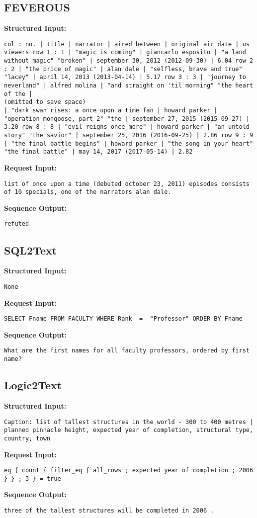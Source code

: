 \documentclass[11pt]{article}
\begin{document}
\subsection{FEVEROUS}
\textbf{Structured Input:} 
\begin{lstlisting}
col : no. | title | narrator | aired between | original air date | us viewers row 1 : 1 | "magic is coming" | giancarlo esposito | "a land without magic" "broken" | september 30, 2012 (2012-09-30) | 6.04 row 2 : 2 | "the price of magic" | alan dale | "selfless, brave and true" "lacey" | april 14, 2013 (2013-04-14) | 5.17 row 3 : 3 | "journey to neverland" | alfred molina | "and straight on 'til morning" "the heart of the | 
(omitted to save space)
| "dark swan rises: a once upon a time fan | howard parker | "operation mongoose, part 2" "the | september 27, 2015 (2015-09-27) | 3.20 row 8 : 8 | "evil reigns once more" | howard parker | "an untold story" "the savior" | september 25, 2016 (2016-09-25) | 2.86 row 9 : 9 | "the final battle begins" | howard parker | "the song in your heart" "the final battle" | may 14, 2017 (2017-05-14) | 2.82
\end{lstlisting}
\textbf{Request Input:} 
\begin{lstlisting}
list of once upon a time (debuted october 23, 2011) episodes consists of 10 specials, one of the narrators alan dale.
\end{lstlisting}
\textbf{Sequence Output:} 
\begin{lstlisting}
refuted
\end{lstlisting}

\subsection{SQL2Text}
\textbf{Structured Input:} 
\begin{lstlisting}
None
\end{lstlisting}
\textbf{Request Input:} 
\begin{lstlisting}
SELECT Fname FROM FACULTY WHERE Rank  =  "Professor" ORDER BY Fname
\end{lstlisting}
\textbf{Sequence Output:} 
\begin{lstlisting}
What are the first names for all faculty professors, ordered by first name?
\end{lstlisting}

\subsection{Logic2Text}
\textbf{Structured Input:} 
\begin{lstlisting}
Caption: list of tallest structures in the world - 300 to 400 metres | planned pinnacle height, expected year of completion, structural type, country, town
\end{lstlisting}
\textbf{Request Input:} 
\begin{lstlisting}
eq { count { filter_eq { all_rows ; expected year of completion ; 2006 } } ; 3 } = true
\end{lstlisting}
\textbf{Sequence Output:} 
\begin{lstlisting}
three of the tallest structures will be completed in 2006 .
\end{lstlisting} 
\end{document}
